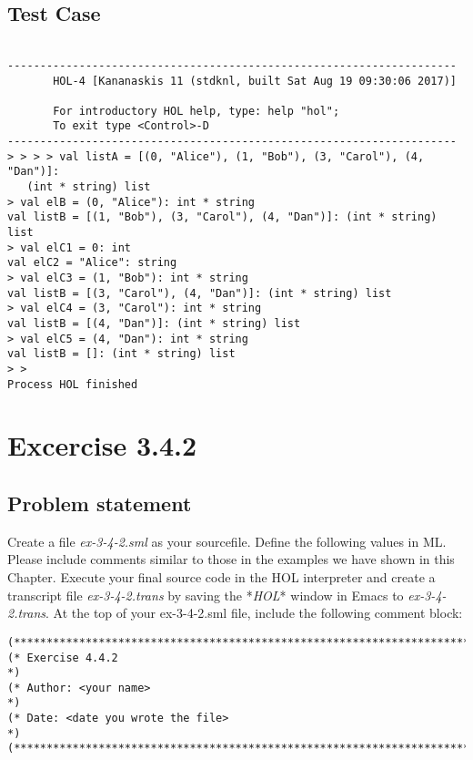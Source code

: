 \documentclass{report}
\begin{document}
\section{Test Case}
\label{test-results-3-4-1}

\begin{session}
  \begin{scriptsize}
\begin{verbatim}

---------------------------------------------------------------------
       HOL-4 [Kananaskis 11 (stdknl, built Sat Aug 19 09:30:06 2017)]

       For introductory HOL help, type: help "hol";
       To exit type <Control>-D
---------------------------------------------------------------------
> > > > val listA = [(0, "Alice"), (1, "Bob"), (3, "Carol"), (4, "Dan")]:
   (int * string) list
> val elB = (0, "Alice"): int * string
val listB = [(1, "Bob"), (3, "Carol"), (4, "Dan")]: (int * string) list
> val elC1 = 0: int
val elC2 = "Alice": string
> val elC3 = (1, "Bob"): int * string
val listB = [(3, "Carol"), (4, "Dan")]: (int * string) list
> val elC4 = (3, "Carol"): int * string
val listB = [(4, "Dan")]: (int * string) list
> val elC5 = (4, "Dan"): int * string
val listB = []: (int * string) list
> > 
Process HOL finished

\end{verbatim}
  \end{scriptsize}
\end{session}



\chapter{Excercise 3.4.2}
\label{cha:3.4.2}


\section{Problem statement}
\label{problem-statement-3-4-2}
Create a file \emph{ex-3-4-2.sml} as your sourcefile. Define the following values in ML. Please include comments similar to those in the examples we have shown in this Chapter. Execute your final source code in the HOL interpreter and create a transcript file \emph{ex-3-4-2.trans} by saving the *\emph{HOL}* window in Emacs to \emph{ex-3-4-2.trans}.
At the top of your ex-3-4-2.sml file, include the following comment block:
\begin{lstlisting}[frame=shadowbox]
(************************************************************************)
(* Exercise 4.4.2														*)
(* Author: <your name>													*)
(* Date: <date you wrote the file>										*)
(************************************************************************)
\end{lstlisting}
\end{document}
